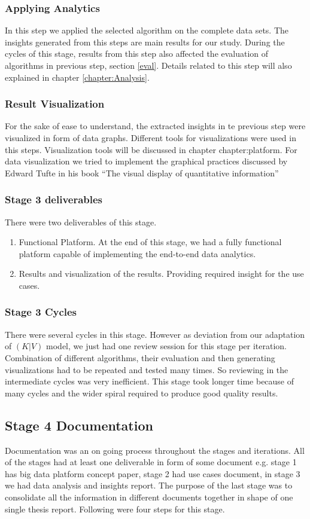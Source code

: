 \subsubsection{Applying Analytics}
In this step we applied the selected algorithm on the complete data sets. The insights generated from this steps are main results for our study. During the cycles of this stage, results from this step also affected the evaluation of algorithms in previous step, section \ref{eval}. Details related to this step will also explained in chapter \ref{chapter:Analysis}.    
\subsubsection{Result Visualization}
For the sake of ease to understand, the extracted insights in te previous step were visualized in form of data graphs. Different tools for visualizations were used in this steps. Visualization tools will be discussed in chapter {chapter:platform}. For data visualization we tried to implement the graphical practices discussed by Edward Tufte in his book ``The visual display of quantitative information''\cite{tufte1983visual}
\subsubsection{Stage 3 deliverables}
There were two deliverables of this stage.
\begin{enumerate}
\item Functional Platform. At the end of this stage, we had a fully functional platform capable of implementing the end-to-end data analytics.
\item Results and visualization of the results. Providing required insight for the use cases. 
\end{enumerate}
\subsubsection{Stage 3 Cycles}
There were several cycles in this stage. However as deviation from our adaptation of \((K|V)\) model, we just had one review session for this stage per iteration. Combination of different algorithms, their evaluation and then generating visualizations had to be repeated and tested many times. So reviewing in the intermediate cycles was very inefficient. This stage took longer time because of many cycles and the wider spiral required to produce good quality results.
\subsection{Stage 4 Documentation}
Documentation was an on going process throughout the stages and iterations. All of the stages had at least one deliverable in form of some document e.g. stage 1 has big data platform concept paper, stage 2 had use cases document, in stage 3 we had data analysis and insights report. The purpose of the last stage was to consolidate all the information in different documents together in shape of one single thesis report. Following were four steps for this stage. 
